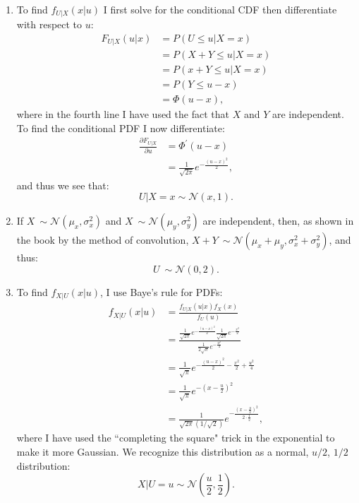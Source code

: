 \begin{problem}{28} $ $
\begin{enumerate}

\item  To find $f_{U|X}(x|u)$ I first solve for the conditional CDF then differentiate with respect to $u$:
\begin{align*}
F_{U|X}(u|x) &= P(U \le u |X=x) \\
& = P(X+Y \le u |X=x) \\
& = P(x+Y \le u |X=x) \\
& = P(Y \le u -x) \\
& = \Phi(u-x),
\end{align*}
where in the fourth line I have used the fact that $X$ and $Y$ are independent.  To find the conditional PDF I now differentiate:
\begin{align*}
\frac{\partial F_{U|X}}{\partial u} &=  \Phi^\prime(u-x) \\
 &=  \frac{1}{\sqrt{2 \pi}} e^{-\frac{(u-x)^2}{2}},
 \end{align*}
 and thus we see that:
 \begin{equation*}
 U|X=x \sim \mathcal N(x, 1).
 \end{equation*}
 
 \item If $X~\sim \mathcal N (\mu_x, \sigma_x^2)$ and $X~\sim \mathcal N (\mu_y, \sigma_y^2)$ are independent, then, as shown in the book by the method of convolution, $X+Y~\sim \mathcal N (\mu_x+\mu_y, \sigma_x^2+\sigma_y^2)$, and thus:
 \begin{equation*}
 U ~\sim \mathcal N(0, 2).
 \end{equation*}
 
 \item To find $f_{X|U}(x|u)$, I use Baye's rule for PDFs:
 \begin{align*}
f_{X|U}(x|u) & =\frac{f_{U|X}(u|x) f_X(x)}{f_U(u)}\\
& = \frac{\frac{1}{\sqrt{2\pi}} e^{-\frac{(u-x)^2}{2}} \frac{1}{\sqrt{2 \pi}} e^{-\frac{x^2}{2}} }{\frac{1}{2\sqrt{\pi}} e^{-\frac{u^2}{4}}} \\
& =\frac{1}{\sqrt{\pi}}e^{-\frac{(u-x)^2}{2} -\frac{x^2}{2}+\frac{u^2}{4}} \\
&=\frac{1}{\sqrt{\pi}} e^{-\left(x-\frac{u}{2}\right)^2} \\
&=\frac{1}{\sqrt{2 \pi} (1/\sqrt{2})} e^{-\frac{\left(x-\frac{u}{2}\right)^2}{2 \cdot \frac{1}{2}}},
 \end{align*}
 where I have used the ``completing the square" trick in the exponential to make it more Gaussian.  We recognize this distribution as a normal, $u/2$, $1/2$ distribution:
  \begin{equation*}
 X|U=u \sim \mathcal N\left (\frac{u}{2}, \frac{1}{2} \right).
 \end{equation*}


\end{enumerate}
\end{problem}
